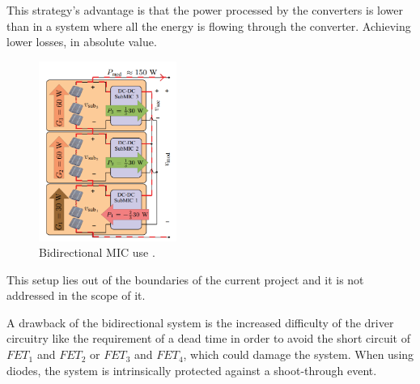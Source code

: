 This strategy's advantage is that the power processed by the converters is lower than in a system where all the energy is flowing through the converter. Achieving lower losses, in absolute value. \cite{ArchitectureMIC}

\begin{figure}[H]
	\begin{center}
		\includegraphics[width=0.4\textwidth]{../Pictures/bidirectional_mic_use}
		\caption{Bidirectional MIC use \cite{ArchitectureMIC}.}
		\label{BID_MIC_ARCHITECTURES}
	\end{center}	
\end{figure}

This setup lies out of the boundaries of the current project and it is not addressed in the scope of it.
		
A drawback of the bidirectional system is the increased difficulty of the driver circuitry like the requirement of a dead time in order to avoid the short circuit of $FET_1$ and $FET_2$ or $FET_3$ and $FET_4$, which could damage the system. When using diodes, the system is intrinsically protected against a shoot-through event.
		
